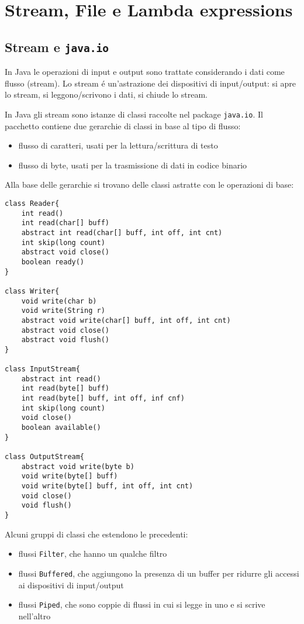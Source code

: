 \chapter{Stream, File e Lambda expressions}

\section{Stream e \texttt{java.io}}
In Java le operazioni di input e output sono trattate considerando i dati come flusso (stream). Lo stream é un'astrazione dei dispositivi di input/output: si apre lo stream, si leggono/scrivono i dati, si chiude lo stream.

In Java gli stream sono istanze di classi raccolte nel package \texttt{java.io}. Il pacchetto contiene due gerarchie di classi in base al tipo di flusso:
\begin{itemize}
 \item flusso di caratteri, usati per la lettura/scrittura di testo
 \item flusso di byte, usati per la trasmissione di dati in codice binario
\end{itemize}
Alla base delle gerarchie si trovano delle classi astratte con le operazioni di base:

\begin{lstlisting}
class Reader{
	int read()
	int read(char[] buff)
	abstract int read(char[] buff, int off, int cnt)
	int skip(long count)
	abstract void close()
	boolean ready()
}

class Writer{
	void write(char b)
	void write(String r)
	abstract void write(char[] buff, int off, int cnt)
	abstract void close()
	abstract void flush()
}

class InputStream{
	abstract int read()
	int read(byte[] buff)
	int read(byte[] buff, int off, inf cnf)
	int skip(long count)
	void close()
	boolean available()
}

class OutputStream{
	abstract void write(byte b)
	void write(byte[] buff)
	void write(byte[] buff, int off, int cnt)
	void close()
	void flush()
}
\end{lstlisting}

Alcuni gruppi di classi che estendono le precedenti:
\begin{itemize}
\item flussi \texttt{Filter}, che hanno un qualche filtro
\item flussi \texttt{Buffered}, che aggiungono la presenza di un buffer per ridurre gli accessi ai dispositivi di input/output
\item flussi \texttt{Piped}, che sono coppie di flussi in cui si legge in uno e si scrive nell'altro
\end{itemize}


